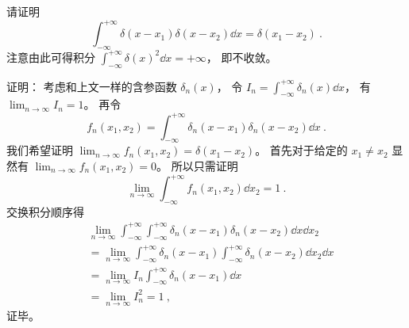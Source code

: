 \begin{example}{}
请证明
\begin{equation}\label{eq_Delta_13}
\int_{-\infty}^{+\infty} \delta(x-x_1) \delta(x-x_2) \dd{x} = \delta(x_1 - x_2)~.
\end{equation}
注意由此可得积分 $\int_{-\infty}^{+\infty}\delta(x)^2 \dd{x} = +\infty$， 即不收敛。

证明： 考虑和上文一样的含参函数 $\delta_n(x)$， 令 $I_n = \int_{-\infty}^{+\infty} \delta_n(x) \dd{x}$， 有 $\lim_{n\to\infty} I_n = 1$。 再令
\begin{equation}
f_n(x_1, x_2) = \int_{-\infty}^{+\infty} \delta_n(x-x_1) \delta_n(x-x_2) \dd{x}~.
\end{equation}
我们希望证明 $\lim_{n\to\infty }f_n(x_1, x_2) = \delta(x_1 - x_2)$。 首先对于给定的 $x_1 \ne x_2$ 显然有 $\lim_{n\to\infty }f_n(x_1, x_2) = 0$。 所以只需证明
\begin{equation}
\lim_{n\to\infty }\int_{-\infty}^{+\infty} f_n(x_1, x_2) \dd{x_2} = 1~.
\end{equation}
交换积分顺序得
\begin{equation}
\begin{aligned}
&\lim_{n\to\infty }\int_{-\infty}^{+\infty}\int_{-\infty}^{+\infty} \delta_n(x-x_1) \delta_n(x-x_2) \dd{x}\dd{x_2}\\
&= \lim_{n\to\infty }\int_{-\infty}^{+\infty} \delta_n(x-x_1) \int_{-\infty}^{+\infty} \delta_n(x-x_2)\dd{x_2} \dd{x}\\
&= \lim_{n\to\infty } I_n \int_{-\infty}^{+\infty} \delta_n(x-x_1)\dd{x}\\
&= \lim_{n\to\infty } I_n^2 = 1~,
\end{aligned}
\end{equation}
证毕。
\end{example}
